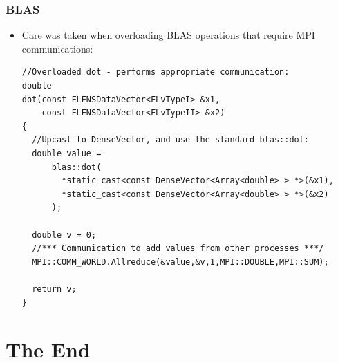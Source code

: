 \documentclass[10pt, a4paper, mathserif]{beamer} %
\newcommand{\<}{$\langle$}
\newcommand{\>}{$\rangle$}
\begin{document}
\begin{frame}[fragile]
\frametitle{BLAS}
\begin{itemize}
	\item <-1> Care was taken when overloading BLAS operations that require MPI communications:
	\begin{lstlisting}
//Overloaded dot - performs appropriate communication:
double
dot(const FLENSDataVector<FLvTypeI> &x1, 
    const FLENSDataVector<FLvTypeII> &x2)
{
  //Upcast to DenseVector, and use the standard blas::dot:
  double value = 
      blas::dot(
        *static_cast<const DenseVector<Array<double> > *>(&x1),
        *static_cast<const DenseVector<Array<double> > *>(&x2)
      );

  double v = 0;
  //*** Communication to add values from other processes ***/
  MPI::COMM_WORLD.Allreduce(&value,&v,1,MPI::DOUBLE,MPI::SUM);

  return v;
}
	\end{lstlisting}
\end{itemize}
\end{frame}

\frame{
\begin{figure}
      \centering
      \newlength\figureheight
      \newlength\figurewidth
      \setlength\figureheight{6cm}
      \setlength\figurewidth{10cm}
      
      \label{fig:assembly}
\end{figure}
}

\frame{
\begin{figure}
      \centering
      \setlength\figureheight{6cm}
      \setlength\figurewidth{10cm}
      
      \label{fig:solver}
\end{figure}
}

\section{The End}
\end{document}

